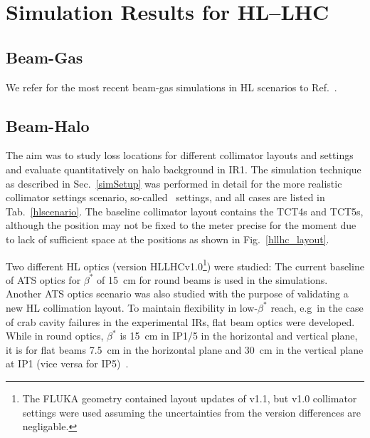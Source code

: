\section{Simulation Results for HL--LHC\label{hllhcResults}}


\subsection{Beam-Gas}

We refer for the most recent beam-gas simulations in HL scenarios to Ref.~\cite{ipac2014_rkh}.

\subsection{Beam-Halo}
The aim was to study loss locations for different collimator layouts and settings and evaluate quantitatively on halo background in IR1. The simulation technique as described in Sec.~\ref{simSetup} was performed in detail for the more realistic collimator settings scenario, so-called \twosigmaret~settings, and all cases are listed in Tab.~\ref{hlscenario}. The baseline collimator layout contains the TCT4s and TCT5s, although the position may not be fixed to the meter precise for the moment due to lack of sufficient space at the positions as shown in Fig.~\ref{hllhc_layout}. 

Two different HL optics (version HLLHCv1.0\footnote{The FLUKA geometry contained layout updates of v1.1, but v1.0 collimator settings were used assuming the uncertainties from the version differences are negligable.}) were studied:
The current baseline of ATS optics for $\beta^{*}$ of 15~cm for round beams is used in the simulations.
Another ATS optics scenario was also studied with the purpose of validating a new HL collimation layout. To maintain flexibility in low-$\beta^*$ reach, e.g~in the case of crab cavity failures in the experimental IRs, flat beam optics were developed. While in round optics, $\beta^*$ is 15~cm in IP1/5 in the horizontal and vertical plane, it is for flat beams 7.5~cm in the horizontal plane and 30~cm in the vertical plane at IP1 (vice versa for IP5)~\cite{opticsWebRef}. 


